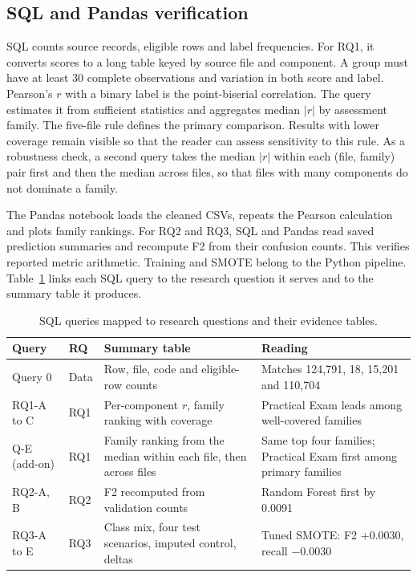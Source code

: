 \documentclass[runningheads]{llncs}
\begin{document}
\subsection{SQL and Pandas verification}
SQL counts source records, eligible rows and label frequencies. For RQ1, it converts scores to a long table keyed by source file and component. A group must have at least 30 complete observations and variation in both score and label. Pearson's $r$ with a binary label is the point-biserial correlation. The query estimates it from sufficient statistics and aggregates median $|r|$ by assessment family. The five-file rule defines the primary comparison. Results with lower coverage remain visible so that the reader can assess sensitivity to this rule. As a robustness check, a second query takes the median $|r|$ within each (file, family) pair first and then the median across files, so that files with many components do not dominate a family.

The Pandas notebook loads the cleaned CSVs, repeats the Pearson calculation and plots family rankings. For RQ2 and RQ3, SQL and Pandas read saved prediction summaries and recompute F2 from their confusion counts. This verifies reported metric arithmetic. Training and SMOTE belong to the Python pipeline. Table~\ref{tab:sql} links each SQL query to the research question it serves and to the summary table it produces.

\begin{table}[h]
\caption{SQL queries mapped to research questions and their evidence tables.}
\label{tab:sql}
\centering
\begin{tabular}{p{1.7cm}p{0.9cm}p{3.7cm}p{3.9cm}}
\toprule
Query & RQ & Summary table & Reading \\
\midrule
Query 0 & Data & Row, file, code and eligible-row counts & Matches 124,791, 18, 15,201 and 110,704 \\
RQ1-A to C & RQ1 & Per-component $r$, family ranking with coverage & Practical Exam leads among well-covered families \\
Q-E (add-on) & RQ1 & Family ranking from the median within each file, then across files & Same top four families; Practical Exam first among primary families \\
RQ2-A, B & RQ2 & F2 recomputed from validation counts & Random Forest first by 0.0091 \\
RQ3-A to E & RQ3 & Class mix, four test scenarios, imputed control, deltas & Tuned SMOTE: F2 $+0.0030$, recall $-0.0030$ \\
\bottomrule
\end{tabular}
\end{table}
\end{document}
